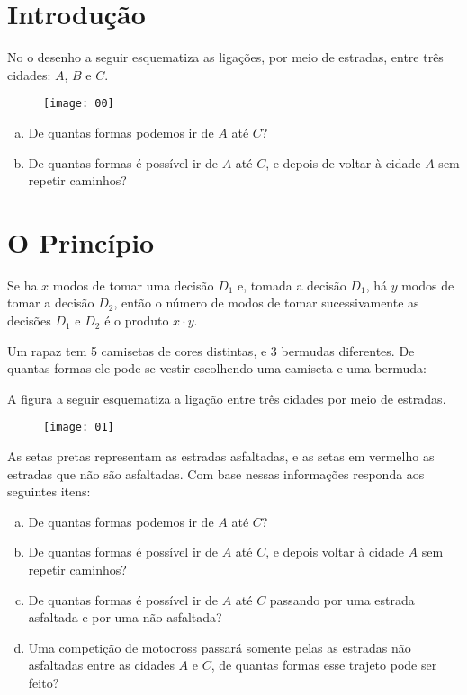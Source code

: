 \documentclass[twocolumn,oneside,a4paper,12pt]{article}
\begin{document}
\maketitle

\section{Introdução}

No o desenho a seguir esquematiza as ligações, por meio de estradas, entre três cidades: \(A\), \(B\) e \(C\).

	\begin{figure}[!tbh]
	\center
	\texttt{[image: 00]}
	\end{figure}

\begin{enumerate}[(a)]
\item De quantas formas podemos ir de \(A\) até \(C\)?
\item De quantas formas é possível ir de \(A\) até \(C\), e depois de voltar à cidade \(A\) sem repetir caminhos?
\end{enumerate}

\section{O Princípio}
 Se ha \(x\) modos de tomar uma decisão \(D_1\) e, tomada a decisão \(D_1\), há \(y\) modos de tomar a decisão \(D_2\), então o número de modos de tomar sucessivamente as decisões \(D_1\) e \(D_2\) é o produto \(x \cdot y\).
 
\begin{exemplo}
Um rapaz tem 5 camisetas de cores distintas, e 3 bermudas diferentes. De quantas formas ele pode se vestir escolhendo uma camiseta e uma bermuda: 
\end{exemplo}

\begin{exemplo}
A figura a seguir esquematiza a ligação entre três cidades por meio de estradas.

	\begin{figure}[!tbh]
	\center
	\texttt{[image: 01]}
	\end{figure}

\noindent As setas pretas representam as estradas asfaltadas, e as setas em vermelho as estradas que não são asfaltadas. Com base nessas informações responda aos seguintes itens:
\end{exemplo}

\begin{enumerate}[(a)]
\item De quantas formas podemos ir de \(A\) até \(C\)?
\item De quantas formas é possível ir de \(A\) até \(C\), e depois voltar à cidade \(A\) sem repetir caminhos?
\item De quantas formas é possível ir de \(A\) até \(C\) passando por uma estrada asfaltada e por uma não asfaltada?
\item Uma competição de motocross passará somente pelas as estradas não asfaltadas entre as cidades \(A\) e \(C\), de quantas formas esse trajeto pode ser feito?
\end{enumerate}
\end{document}
